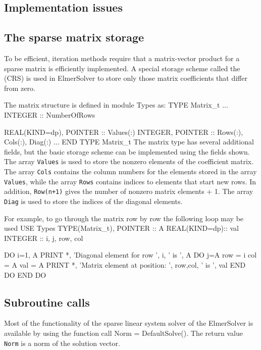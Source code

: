 \begin{versiona}

\section{Implementation issues}

\subsection{The sparse matrix storage}

To be efficient, iteration methods require that a matrix-vector product
for a sparse matrix is efficiently implemented. A special
storage scheme called the  (CRS) \cite{Barrett93} is used in ElmerSolver
to store only those matrix coefficients that differ from zero.

The matrix structure is defined in module Types as:
\ttbegin
  TYPE Matrix_t
     ...
    INTEGER :: NumberOfRows

    REAL(KIND=dp),  POINTER :: Values(:)
    INTEGER, POINTER :: Rows(:), Cols(:), Diag(:)
     ...
  END TYPE Matrix_t
\ttend
The matrix type has several additional fields, but the basic storage scheme can be implemented  
using the fields shown. The array {\tt Values} is used to store the nonzero elements of
the coefficient matrix. The array {\tt Cols} contains the column numbers for the elements 
stored in the array {\tt Values}, while the array {\tt Rows} contains indices to 
elements that start new rows. In addition, 
{\tt Row(n+1)} gives the number of nonzero matrix elements + 1. 
The array {\tt Diag} is used to store the indices of the diagonal elements. 

For example, to go through the matrix row by row the 
following loop may be used
\ttbegin
  USE Types
  TYPE(Matrix_t), POINTER :: A
  REAL(KIND=dp):: val
  INTEGER :: i, j, row, col

  DO i=1, A %
    PRINT *, 'Diagonal element for row ', i, ' is ', A %
    DO j=A %
       row = i
       col = A %
       val = A %
       PRINT *, 'Matrix element at position: ', row,col, ' is ', val
    END DO
  END DO
\ttend


\subsection{Subroutine calls}

Most of the functionality of the sparse linear system solver of the ElmerSolver is
available by using the function call
\ttbegin
  Norm = DefaultSolve().
\ttend
The return value {\tt Norm} is a norm of the solution vector.


\end{versiona}

